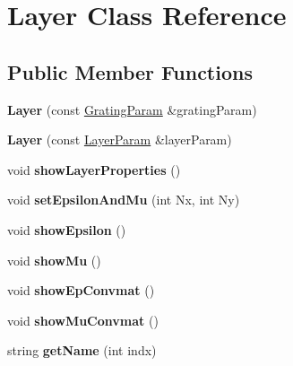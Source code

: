 \hypertarget{class_layer}{}\section{Layer Class Reference}
\label{class_layer}
\subsection*{Public Member Functions}
\begin{DoxyCompactItemize}
\item 
{\bfseries Layer} (const \hyperlink{structinput}{Grating\+Param} \&grating\+Param)\hypertarget{class_layer_a9968468c83794d4b017277e064f97496}{}\label{class_layer_a9968468c83794d4b017277e064f97496}

\item 
{\bfseries Layer} (const \hyperlink{structinput1}{Layer\+Param} \&layer\+Param)\hypertarget{class_layer_af6b47eff187b3b79b56b501c900b7075}{}\label{class_layer_af6b47eff187b3b79b56b501c900b7075}

\item 
void {\bfseries show\+Layer\+Properties} ()\hypertarget{class_layer_a76f3f2cd995a4ee5cc841c7ebf25afd1}{}\label{class_layer_a76f3f2cd995a4ee5cc841c7ebf25afd1}

\item 
void {\bfseries set\+Epsilon\+And\+Mu} (int Nx, int Ny)\hypertarget{class_layer_a36a4d435176e60e1226955d29e00dff2}{}\label{class_layer_a36a4d435176e60e1226955d29e00dff2}

\item 
void {\bfseries show\+Epsilon} ()\hypertarget{class_layer_a08e4b46be9ec3eba49967d9972115e67}{}\label{class_layer_a08e4b46be9ec3eba49967d9972115e67}

\item 
void {\bfseries show\+Mu} ()\hypertarget{class_layer_aaa0ab5dc1a1a9b2a5f84195ea7ac89b2}{}\label{class_layer_aaa0ab5dc1a1a9b2a5f84195ea7ac89b2}

\item 
void {\bfseries show\+Ep\+Convmat} ()\hypertarget{class_layer_adaa5860d7d74c8cb84a5fd347c0785ba}{}\label{class_layer_adaa5860d7d74c8cb84a5fd347c0785ba}

\item 
void {\bfseries show\+Mu\+Convmat} ()\hypertarget{class_layer_ab293ab75edd6c77e70e5d104056bcb74}{}\label{class_layer_ab293ab75edd6c77e70e5d104056bcb74}

\item 
string {\bfseries get\+Name} (int indx)\hypertarget{class_layer_a52558e9b5b84247cb639912482580ac9}{}\label{class_layer_a52558e9b5b84247cb639912482580ac9}


\end{DoxyCompactItemize}

